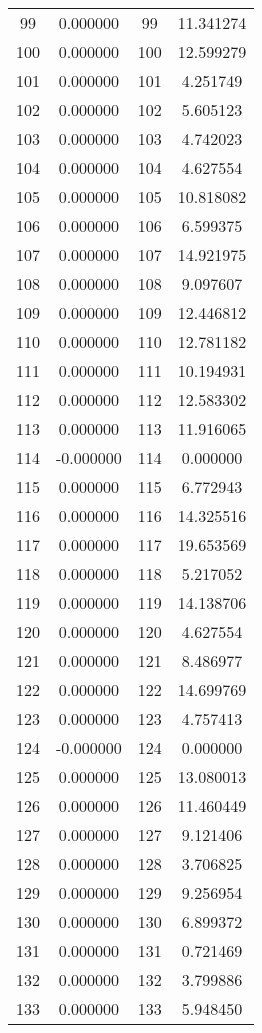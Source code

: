 \documentclass[12pt]{article}
\begin{document}
\begin{longtable}{@{}cccc@{}}
99 & 0.000000 & 99 & 11.341274 \\
100 & 0.000000 & 100 & 12.599279 \\
101 & 0.000000 & 101 & 4.251749 \\
102 & 0.000000 & 102 & 5.605123 \\
103 & 0.000000 & 103 & 4.742023 \\
104 & 0.000000 & 104 & 4.627554 \\
105 & 0.000000 & 105 & 10.818082 \\
106 & 0.000000 & 106 & 6.599375 \\
107 & 0.000000 & 107 & 14.921975 \\
108 & 0.000000 & 108 & 9.097607 \\
109 & 0.000000 & 109 & 12.446812 \\
110 & 0.000000 & 110 & 12.781182 \\
111 & 0.000000 & 111 & 10.194931 \\
112 & 0.000000 & 112 & 12.583302 \\
113 & 0.000000 & 113 & 11.916065 \\
114 & -0.000000 & 114 & 0.000000 \\
115 & 0.000000 & 115 & 6.772943 \\
116 & 0.000000 & 116 & 14.325516 \\
117 & 0.000000 & 117 & 19.653569 \\
118 & 0.000000 & 118 & 5.217052 \\
119 & 0.000000 & 119 & 14.138706 \\
120 & 0.000000 & 120 & 4.627554 \\
121 & 0.000000 & 121 & 8.486977 \\
122 & 0.000000 & 122 & 14.699769 \\
123 & 0.000000 & 123 & 4.757413 \\
124 & -0.000000 & 124 & 0.000000 \\
125 & 0.000000 & 125 & 13.080013 \\
126 & 0.000000 & 126 & 11.460449 \\
127 & 0.000000 & 127 & 9.121406 \\
128 & 0.000000 & 128 & 3.706825 \\
129 & 0.000000 & 129 & 9.256954 \\
130 & 0.000000 & 130 & 6.899372 \\
131 & 0.000000 & 131 & 0.721469 \\
132 & 0.000000 & 132 & 3.799886 \\
133 & 0.000000 & 133 & 5.948450 \\

\end{longtable}
\end{document}
